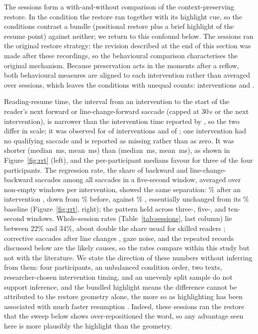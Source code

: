 The \sessionsN{} sessions form a with-and-without comparison of the context-preserving restore.
In the \on{} condition the restore ran together with its highlight cue, so the conditions contrast a bundle (positional restore plus a brief highlight of the resume point) against neither; we return to this confound below.
The \on{} sessions ran the original restore strategy; the revision described at the end of this section was made after these recordings, so the behavioural comparison characterises the original mechanism.
Because preservation acts in the moments after a reflow, both behavioural measures are aligned to each intervention rather than averaged over sessions, which leaves the conditions with unequal counts: \interventionsWith{} interventions \on{} and \interventionsWithout{} \off{}.

Reading-resume time, the interval from an intervention to the start of the reader's next forward or line-change-forward saccade (capped at 30\,s or the next intervention), is narrower than the intervention time reported by \citet{jensen2025context}, so the two differ in scale; it was observed for \rrtWithObserved{} of \interventionsWith{} interventions \on{} and \rrtWithoutObserved{} of \interventionsWithout{} \off{}; one \off{} intervention had no qualifying saccade and is reported as missing rather than as zero.
It was shorter \on{} (median \rrtWithMedian{}\,ms, mean \rrtWithMean{}\,ms) than \off{} (median \rrtWithoutMedian{}\,ms, mean \rrtWithoutMean{}\,ms), as shown in Figure~\ref{fig:rrt} (left), and the per-participant medians favour \on{} for three of the four participants.
The regression rate, the share of backward and line-change-backward saccades among all saccades in a five-second window, averaged over non-empty windows per intervention, showed the same separation: \regWithPost\% after an intervention \on{}, down from \regWithPre\% before, against \regWithoutPost\% \off{}, essentially unchanged from its \regWithoutPre\% baseline (Figure~\ref{fig:rrt}, right); the pattern held across three-, five-, and ten-second windows.
Whole-session rates (Table~\ref{tab:sessions}, last column) lie between 22\% and 34\%, about double the share usual for skilled readers \cite{rayner1998eyemovements}; corrective saccades after line changes \cite{parker2019returnsweep}, gaze noise, and the repeated records discussed below are the likely causes, so the rates compare within this study but not with the literature.
We state the direction of these numbers without inferring from them: four participants, an unbalanced condition order, two texts, researcher-chosen intervention timing, and an unevenly split sample do not support inference, and the bundled highlight means the difference cannot be attributed to the restore geometry alone, the more so as highlighting has been associated with much faster resumption \cite{jensen2025context}.
Indeed, these sessions ran the restore that the sweep below shows over-repositioned the word, so any advantage seen here is more plausibly the highlight than the geometry.

